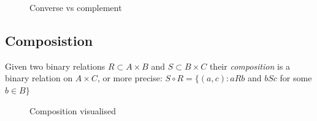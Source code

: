 \documentclass[12pt]{article} %
\begin{document}
\begin{figure}[H]
\caption{Converse vs complement}
\label{Converse vs complement}
\end{figure}

\subsection{Composistion}
Given two binary relations $R \subset A \times B$ and $S \subset B \times C$ their \textit{composition} is a binary relation on $A \times C$, or more precise: $S \circ R = \{(a,c) : aRb$ and $bSc$ for some $b \in B\}$ 


\begin{figure}[H]
\caption{Composition visualised}
\label{Composition visualised}
\end{figure}
\end{document}
